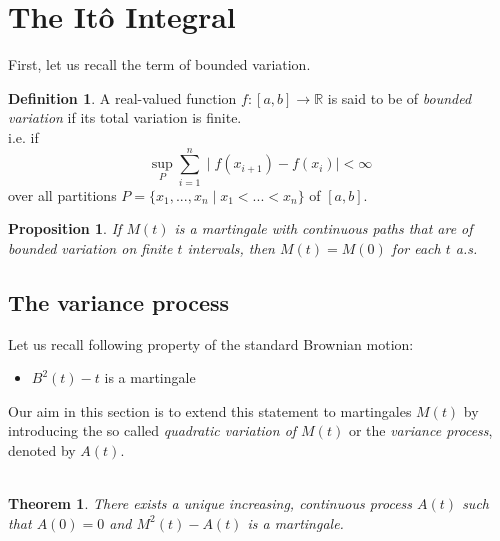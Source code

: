 \documentclass[11pt,a4paper, final]{article}
\newtheorem{thm}{Theorem}[section]
\newtheorem{prop}{Proposition}[section]
\theoremstyle{definition}
\newtheorem{defn}{Definition}[section]
\begin{document}
\section{The Itô Integral}
First, let us recall the term of bounded variation.
\begin{defn}
A real-valued function $f: [a,b] \rightarrow \mathbb{R}$ is said to be of \textit{bounded variation} if its total variation is finite.\\
i.e. if $$ \sup_P \sum \limits_{i=1}^n \mid f(x_{i+1})-f(x_i)\mid < \infty $$
over all partitions $P = \{x_1, ..., x_n \mid x_1<...<x_n\}$ of $[a,b]$.
\end{defn}

\begin{prop}  \label{first Prop}
If $M(t)$ is a martingale with continuous paths that are of bounded variation on finite $t$ intervals, then $M(t) = M(0)$ for each $t$ a.s.
\end{prop}

\subsection{The variance process}
Let us recall following property of the standard Brownian motion:
\begin{itemize}
\item $B^2(t)-t$ is a martingale
\end{itemize}
Our aim in this section is to extend this statement to martingales $M(t)$ by introducing the so called \textit{quadratic variation of $M(t)$} or the \textit{variance process}, denoted by $A(t)$.
\\\\

\begin{thm}
There exists a unique increasing, continuous process $A(t)$ such that $A(0)=0$ and $M^2(t)-A(t)$ is a martingale.
\end{thm}
\end{document}
